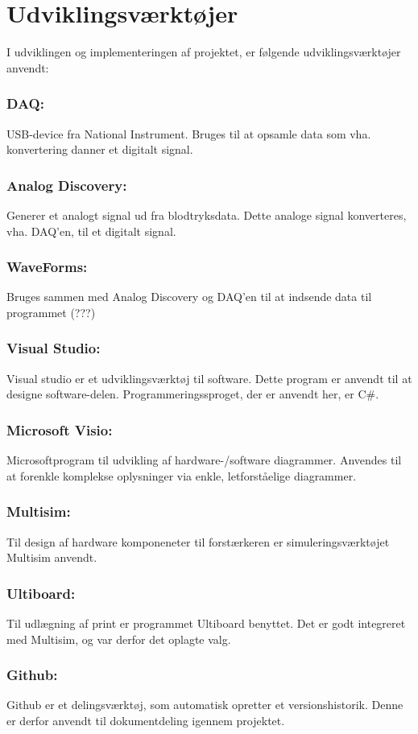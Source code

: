 \section{Udviklingsværktøjer} %
I udviklingen og implementeringen af projektet, er følgende udviklingsværktøjer anvendt:
\subsubsection{DAQ:}
USB-device fra National Instrument. Bruges til at opsamle data som vha. konvertering danner et digitalt signal.
\subsubsection{Analog Discovery:}
Generer et analogt signal ud fra blodtryksdata. Dette analoge signal konverteres, vha. DAQ'en, til et digitalt signal.
\subsubsection{WaveForms:}
Bruges sammen med Analog Discovery og DAQ'en til at indsende data til programmet (???)
\subsubsection{Visual Studio:}
Visual studio er et udviklingsværktøj til software. Dette program er anvendt til at designe software-delen. Programmeringssproget, der er anvendt her, er C$\#$. 
\subsubsection{Microsoft Visio:}
Microsoftprogram til udvikling af hardware-/software diagrammer. Anvendes til at forenkle komplekse oplysninger via enkle, letforståelige diagrammer.
\subsubsection{Multisim:}
Til design af hardware komponeneter til forstærkeren er simuleringsværktøjet Multisim anvendt. 
\subsubsection{Ultiboard:}
Til udlægning af print er programmet Ultiboard benyttet. Det er godt integreret med Multisim, og var derfor det oplagte valg.
\subsubsection{Github:}
Github er et delingsværktøj, som automatisk opretter et versionshistorik. Denne er derfor anvendt til dokumentdeling igennem projektet. 
